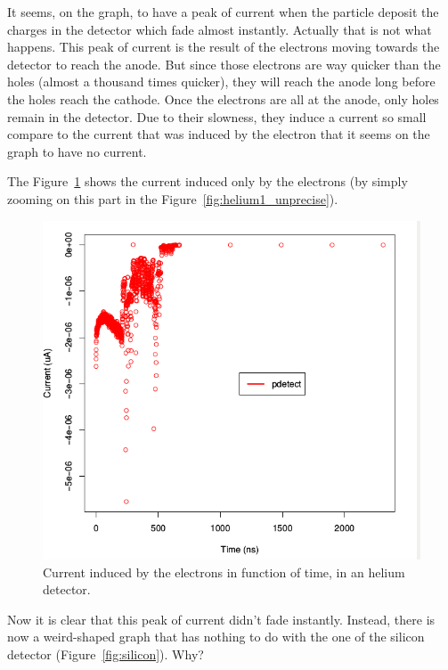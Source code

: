 \documentclass[11pt]{article}
\begin{document}
			It seems, on the graph, to have a peak of current when the particle deposit the charges in the
			detector which fade almost instantly. Actually that is not what happens. This peak of current
			is the result of the electrons moving towards the detector to reach the anode. But since those
			electrons are way quicker than the holes (almost a thousand times quicker), they will reach the
			anode long before the holes reach the cathode. Once the electrons are all at the anode, only holes 
			remain in the detector. Due to their slowness, they induce a current so small compare to the
			current that was induced by the electron that it seems on the graph to have no current.

			The Figure~\ref{fig:helium1_precise} shows the current induced only by the electrons (by simply zooming
			on this part in the Figure~\ref{fig:helium1_unprecise}).

			\begin{figure}[H]
			  \center
			  \includegraphics[scale=0.5]{images/applications/helium1_precise.png}
			  \caption{Current induced by the electrons in function of time, in an helium detector.}
			  \label{fig:helium1_precise}
			\end{figure}

			Now it is clear that this peak of current didn't fade instantly. Instead, there is now a weird-shaped 
			graph that has nothing to do with the one of the silicon detector (Figure~\ref{fig:silicon}). Why?
\end{document}
